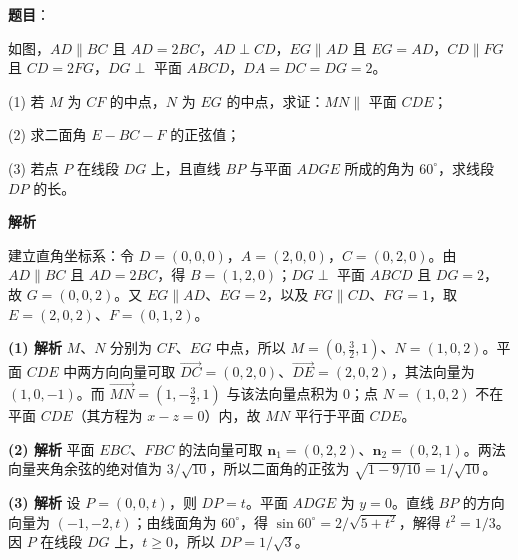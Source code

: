 \begin{answer}

\textbf{题目}：

如图，$AD\parallel BC$ 且 $AD=2BC$，$AD\perp CD$，$EG\parallel AD$ 且 $EG=AD$，$CD\parallel FG$ 且 $CD=2FG$，$DG\perp$ 平面 $ABCD$，$DA=DC=DG=2$。

(1) 若 $M$ 为 $CF$ 的中点，$N$ 为 $EG$ 的中点，求证：$MN\parallel$ 平面 $CDE$；

(2) 求二面角 $E-BC-F$ 的正弦值；

(3) 若点 $P$ 在线段 $DG$ 上，且直线 $BP$ 与平面 $ADGE$ 所成的角为 $60^\circ$，求线段 $DP$ 的长。
\nopagebreak[4]
\begin{center}\end{center}
\nopagebreak[4]
\textbf{解析}

建立直角坐标系：令 $D=(0,0,0)$，$A=(2,0,0)$，$C=(0,2,0)$。由 $AD\parallel BC$ 且 $AD=2BC$，得 $B=(1,2,0)$；$DG\perp$ 平面 $ABCD$ 且 $DG=2$，故 $G=(0,0,2)$。又 $EG\parallel AD$、$EG=2$，以及 $FG\parallel CD$、$FG=1$，取 $E=(2,0,2)$、$F=(0,1,2)$。

\textbf{(1) 解析} $M$、$N$ 分别为 $CF$、$EG$ 中点，所以 $M=(0,\tfrac32,1)$、$N=(1,0,2)$。平面 $CDE$ 中两方向向量可取 $\overrightarrow{DC}=(0,2,0)$、$\overrightarrow{DE}=(2,0,2)$，其法向量为 $(1,0,-1)$。而 $\overrightarrow{MN}=(1,-\tfrac32,1)$ 与该法向量点积为 $0$；点 $N=(1,0,2)$ 不在平面 $CDE$（其方程为 $x-z=0$）内，故 $MN$ 平行于平面 $CDE$。

\textbf{(2) 解析} 平面 $EBC$、$FBC$ 的法向量可取 $\mathbf n_1=(0,2,2)$、$\mathbf n_2=(0,2,1)$。两法向量夹角余弦的绝对值为 $3/\sqrt{10}$，所以二面角的正弦为 $\sqrt{1-9/10}=1/\sqrt{10}$。

\textbf{(3) 解析} 设 $P=(0,0,t)$，则 $DP=t$。平面 $ADGE$ 为 $y=0$。直线 $BP$ 的方向向量为 $(-1,-2,t)$；由线面角为 $60^\circ$，得 $\sin60^\circ=2/\sqrt{5+t^2}$，解得 $t^2=1/3$。因 $P$ 在线段 $DG$ 上，$t\ge0$，所以 $DP=1/\sqrt3$。




\end{answer}
